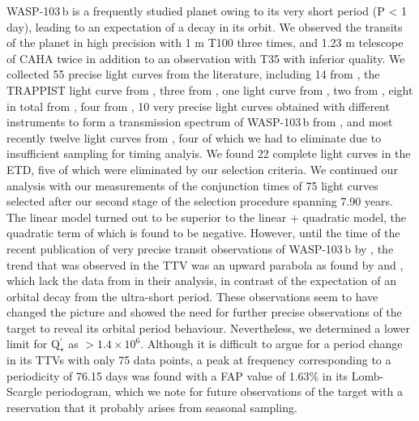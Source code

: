 \documentclass[a4paper,fleqn,usenatbib]{mnras}
\begin{document}
WASP-103\,b is a frequently studied planet owing to its very short period (P < 1 day), leading to an expectation of a decay in its orbit. We observed the transits of the planet in high precision with 1 m T100 three times, and 1.23 m telescope of CAHA twice in addition to an observation with T35 with inferior quality. We collected 55 precise light curves from the literature, including 14 from \cite{2015MNRAS.447..711S}, the TRAPPIST light curve from \citep{2014A&A...562L...3G}, three from \cite{2017A&A...606A..18L}, one light curve from \citep{2017MNRAS.472.3871T}, two from \citep{2018MNRAS.474.2334D}, eight in total from \cite{2018AcA....68..371M}, four from \cite{2020AJ....159..150P}, 10 very precise light curves obtained with different instruments to form a transmission spectrum of WASP-103\,b from \cite{2021AJ....162...34K}, and most recently twelve light curves from \cite{2022A&A...658C...1B}, four of which we had to eliminate due to insufficient sampling for timing analyis. We found 22 complete light curves in the ETD, five of which were eliminated by our selection criteria. We continued our analysis with our measurements of the conjunction times of 75 light curves selected after our second stage of the selection procedure spanning 7.90 years. The linear model turned out to be superior to the linear + quadratic model, the quadratic term of which is found to be negative. However, until the time of the recent publication of very precise transit observations of WASP-103\,b by \cite{2021AJ....162...34K}, the trend that was observed in the TTV was an upward parabola as found by \cite{2020AJ....159..150P} and \cite{2022A&A...658C...1B}, which lack the data from \cite{2021AJ....162...34K} in their analysis,  in contrast of the expectation of an orbital decay from the ultra-short period. These observations seem to have changed the picture and showed the need for further precise observations of the target to reveal its orbital period behaviour. Nevertheless, we determined a lower limit for Q$^{\prime}_{\star}$ as $> 1.4 \times 10^6$. Although it is difficult to argue for a period change in its TTVs with only 75 data points, a peak at frequency corresponding to a periodicity of 76.15 days was found with a FAP value of 1.63\% in its Lomb-Scargle periodogram, which we note for future observations of the target with a reservation that it probably arises from seasonal sampling.  
\end{document}
